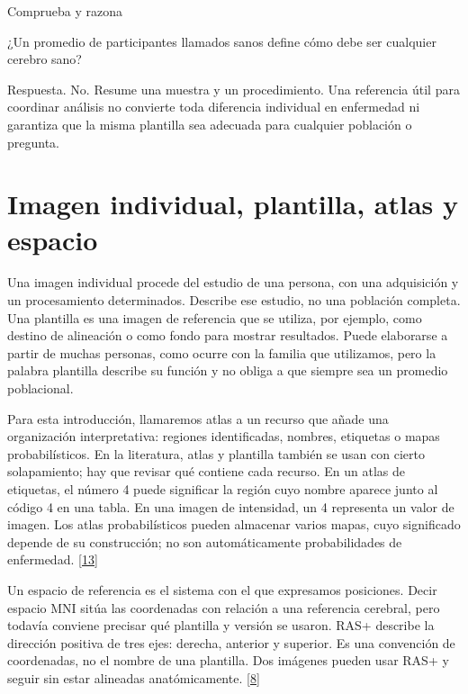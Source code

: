 
\begin{Practica}{Comprueba y razona}

¿Un promedio de participantes llamados sanos define cómo debe ser cualquier cerebro sano?


Respuesta. No. Resume una muestra y un procedimiento. Una referencia útil para coordinar análisis no convierte toda diferencia individual en enfermedad ni garantiza que la misma plantilla sea adecuada para cualquier población o pregunta.


\end{Practica}

\section{Imagen individual, plantilla, atlas y espacio}

Una imagen individual procede del estudio de una persona, con una adquisición y un procesamiento determinados. Describe ese estudio, no una población completa. Una plantilla es una imagen de referencia que se utiliza, por ejemplo, como destino de alineación o como fondo para mostrar resultados. Puede elaborarse a partir de muchas personas, como ocurre con la familia que utilizamos, pero la palabra plantilla describe su función y no obliga a que siempre sea un promedio poblacional.


Para esta introducción, llamaremos atlas a un recurso que añade una organización interpretativa: regiones identificadas, nombres, etiquetas o mapas probabilísticos. En la literatura, atlas y plantilla también se usan con cierto solapamiento; hay que revisar qué contiene cada recurso. En un atlas de etiquetas, el número 4 puede significar la región cuyo nombre aparece junto al código 4 en una tabla. En una imagen de intensidad, un 4 representa un valor de imagen. Los atlas probabilísticos pueden almacenar varios mapas, cuyo significado depende de su construcción; no son automáticamente probabilidades de enfermedad. \hyperlink{refR13}{[13]}


Un espacio de referencia es el sistema con el que expresamos posiciones. Decir espacio MNI sitúa las coordenadas con relación a una referencia cerebral, pero todavía conviene precisar qué plantilla y versión se usaron. RAS+ describe la dirección positiva de tres ejes: derecha, anterior y superior. Es una convención de coordenadas, no el nombre de una plantilla. Dos imágenes pueden usar RAS+ y seguir sin estar alineadas anatómicamente. \hyperlink{refR8}{[8]}


